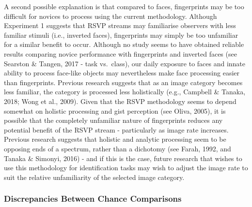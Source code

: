 \documentclass[
  english,
  man]{apa6}
\begin{document}
A second possible explanation is that compared to faces, fingerprints may be too difficult for novices to process using the current methodology. Although Experiment 1 suggests that RSVP streams may familiarise observers with less familiar stimuli (i.e., inverted faces), fingerprints may simply be too unfamiliar for a similar benefit to occur. Although no study seems to have obtained reliable results comparing novice performance with fingerprints and inverted faces (see Searston \& Tangen, 2017 - task vs.~class), our daily exposure to faces and innate ability to process face-like objects may nevertheless make face processing easier than fingerprints. Previous research suggests that as an image category becomes less familiar, the category is processed less holistically (e.g., Campbell \& Tanaka, 2018; Wong et al., 2009). Given that the RSVP methodology seems to depend somewhat on holistic processing and gist perception (see Oliva, 2005), it is possible that the completely unfamiliar nature of fingerprints reduces any potential benefit of the RSVP stream - particularly as image rate increases. Previous research suggests that holistic and analytic processing seem to be opposing ends of a spectrum, rather than a dichotomy (see Farah, 1992, and Tanaka \& Simonyi, 2016) - and if this is the case, future research that wishes to use this methodology for identification tasks may wish to adjust the image rate to suit the relative unfamiliarity of the selected image category.

\hypertarget{discrepancies-between-chance-comparisons}{%
\subsubsection{Discrepancies Between Chance Comparisons}\label{discrepancies-between-chance-comparisons}}
\end{document}
